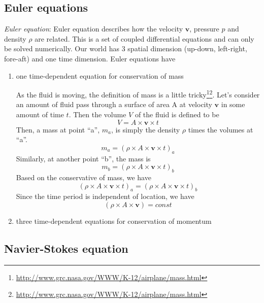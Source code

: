 \subsection{Euler equations}

{\it Euler equation}: Euler equation describes how the velocity
$\mathbf{v}$, pressure $p$ and density $\rho$ are related. This is a
set of coupled differential equations and can only be solved
numerically. Our world has 3 spatial dimension (up-down, left-right,
fore-aft) and one time dimension. Euler equations have
\begin{enumerate}
\item one time-dependent equation for conservation of mass

  As the fluid is moving, the definition of mass is a little
  tricky\footnote{\url{http://www.grc.nasa.gov/WWW/K-12/airplane/mass.html}}\footnote{\url{http://www.grc.nasa.gov/WWW/K-12/airplane/mass.html}}. Let's consider an amount of fluid pass through a surface of
  area A at velocity $\mathbf{v}$ in some amount of time $t$. Then the
  volume $V$ of the fluid is defined to be
\begin{equation}
  \label{eq:78}
  V = A\times \mathbf{v} \times t
\end{equation}
Then, a mass at point ``a'', $m_a$, is simply the density $\rho$ times
the volumes at ``a''.
\begin{equation}
  \label{eq:79}
  m_a = (\rho \times A\times \mathbf{v} \times t)_a
\end{equation}
Similarly, at another point ``b'', the mass is
\begin{equation}
  \label{eq:80}
  m_b = (\rho \times A\times \mathbf{v} \times t)_b
\end{equation}
Based on the conservative of mass, we have
\begin{equation}
  \label{eq:81}
 (\rho \times A\times \mathbf{v} \times t)_a = (\rho \times A\times \mathbf{v} \times t)_b
\end{equation}
Since the time period is independent of location, we have
\begin{equation}
  \label{eq:82}
  (\rho \times A\times \mathbf{v}) = const
\end{equation}

\item three time-dependent equations for conservation of momentum
\end{enumerate}

\subsection{Navier-Stokes equation}

